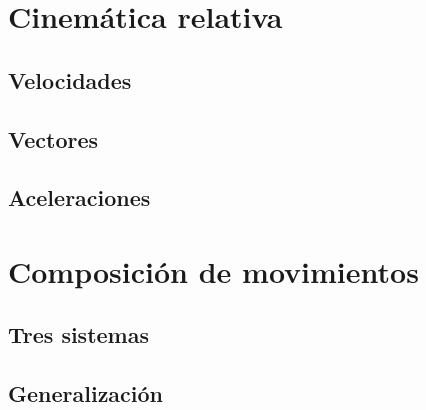 \section{Cinemática relativa}
\subsection{Velocidades}

\subsection{Vectores}

\subsection{Aceleraciones}

\section{Composición de movimientos}
\subsection{Tres sistemas}

\subsection{Generalización}